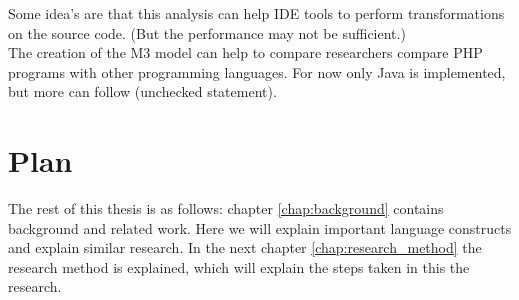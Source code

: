 \documentclass[../main.tex]{subfiles}
\begin{document}
        Some idea's are that this analysis can help IDE tools to perform transformations on the source code.
        (But the performance may not be sufficient.)
        \\
        The creation of the M3 model can help to compare researchers compare PHP programs with other programming languages. For now only Java is implemented, but more can follow (unchecked statement).
    
    \section{Plan} %
        The rest of this thesis is as follows:
        chapter \ref{chap:background} contains background and related work.
        Here we will explain important language constructs and explain similar research.
        In the next chapter \ref{chap:research_method} the research method is explained, which will explain the steps taken in this the research.
        
\end{document}
